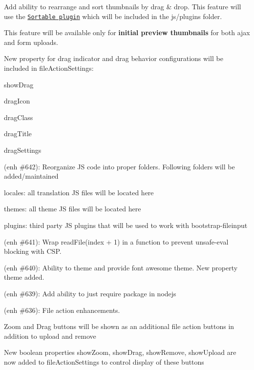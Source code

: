 \begin{DoxyItemize}
\begin{DoxyItemize}
\item Add ability to rearrange and sort thumbnails by drag \& drop. This feature will use the \href{https://github.com/RubaXa/Sortable}{\tt Sortable plugin} which will be included in the {\ttfamily js/plugins} folder.
\item This feature will be available only for {\bfseries initial preview thumbnails} for both ajax and form uploads.
\item New property for drag indicator and drag behavior configurations will be included in {\ttfamily file\+Action\+Settings}\+:
\begin{DoxyItemize}
\item {\ttfamily show\+Drag}
\item {\ttfamily drag\+Icon}
\item {\ttfamily drag\+Class}
\item {\ttfamily drag\+Title}
\item {\ttfamily drag\+Settings}
\end{DoxyItemize}
\end{DoxyItemize}
\item (enh \#642)\+: Reorganize JS code into proper folders. Following folders will be added/maintained
\begin{DoxyItemize}
\item {\ttfamily locales}\+: all translation JS files will be located here
\item {\ttfamily themes}\+: all theme JS files will be located here
\item {\ttfamily plugins}\+: third party JS plugins that will be used to work with bootstrap-\/fileinput
\end{DoxyItemize}
\item (enh \#641)\+: Wrap read\+File(index + 1) in a function to prevent \textquotesingle{}unsafe-\/eval\textquotesingle{} blocking with C\+SP.
\item (enh \#640)\+: Ability to theme and provide font awesome theme. New property {\ttfamily theme} added.
\item (enh \#639)\+: Add ability to just require package in nodejs
\item (enh \#636)\+: File action enhancements.
\begin{DoxyItemize}
\item Zoom and Drag buttons will be shown as an additional file action buttons in addition to {\ttfamily upload} and {\ttfamily remove}
\item New boolean properties {\ttfamily show\+Zoom}, {\ttfamily show\+Drag}, {\ttfamily show\+Remove}, {\ttfamily show\+Upload} are now added to {\ttfamily file\+Action\+Settings} to control display of these buttons

\end{DoxyItemize}
\end{DoxyItemize}
